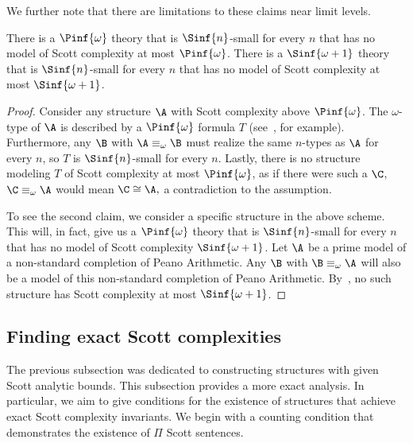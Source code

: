 \documentclass{amsart}
\renewcommand{\-}{\text{-}}
\begin{document}
We further note that there are limitations to these claims near limit levels.

\begin{proposition}
There is a $\Pinf{\omega}$ theory that is $\Sinf{n}$-small for every $n$ that has no model of Scott complexity at most $\Pinf{\omega}$.
There is a $\Sinf{\omega+1}$ theory that is $\Sinf{n}$-small for every $n$ that has no model of Scott complexity at most $\Sinf{\omega+1}$.
\end{proposition}

\begin{proof}
Consider any structure $\A$ with Scott complexity above $\Pinf{\omega}$.
The $\omega$-type of $\A$ is described by a $\Pinf{\omega}$ formula $T$ (see~\cite{CGHT}, for example).
Furthermore, any $\B$ with $\A\equiv_\omega\B$ must realize the same $n$-types as $\A$ for every $n$, so $T$ is $\Sinf{n}$-small for every $n$.
Lastly, there is no structure modeling $T$ of Scott complexity at most $\Pinf{\omega}$, as if there were such a $\C$, $\C\equiv_\omega \A$ would mean $\C\cong\A,$ a contradiction to the assumption.

To see the second claim, we consider a specific structure in the above scheme.
This will, in fact, give us a $\Pinf{\omega}$ theory that is $\Sinf{n}$-small for every $n$ that has no model of Scott complexity  $\Sinf{\omega+1}$.
Let $\A$ be a prime model of a non-standard completion of Peano Arithmetic.
Any $\B$ with $\B\equiv_\omega \A$ will also be a model of this non-standard completion of Peano Arithmetic.
By~\cite{GLRS}, no such structure has Scott complexity at most $\Sinf{\omega+1}$.
\end{proof}

\subsection{Finding exact Scott complexities}\label{sec:exactSC}

The previous subsection was dedicated to constructing structures with given Scott analytic bounds.
This subsection provides a more exact analysis.
In particular, we aim to give conditions for the existence of structures that achieve exact Scott complexity invariants.
We begin with a counting condition that demonstrates the existence of $\Pi$ Scott sentences.
\end{document}
